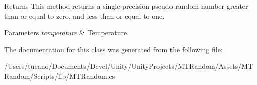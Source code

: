 \begin{DoxyReturn}{Returns}
This method returns a single-\/precision pseudo-\/random number greater than or equal to zero, and less than or equal to one. 
\end{DoxyReturn}

\begin{DoxyParams}{Parameters}
{\em temperature} & Temperature.\\
\hline
\end{DoxyParams}


The documentation for this class was generated from the following file\+:\begin{DoxyCompactItemize}
\item 
/\+Users/tucano/\+Documents/\+Devel/\+Unity/\+Unity\+Projects/\+M\+T\+Random/\+Assets/\+M\+T\+Random/\+Scripts/lib/M\+T\+Random.\+cs\end{DoxyCompactItemize}
